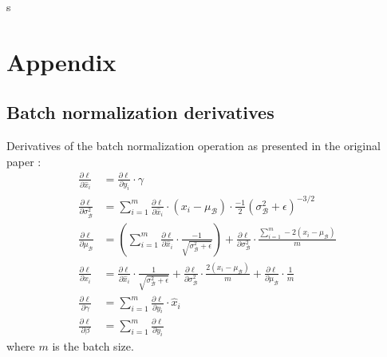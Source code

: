 \documentclass[a4paper,11pt]{article} %
\begin{document}
\newpage
s


\newpage
\section{Appendix}
\subsection{Batch normalization derivatives} \label{appendix:batch-norm-grad}
Derivatives of the batch normalization operation as presented in the original paper \cite{ioffe2015batch}:
\begin{equation}
  \begin{aligned}
    \frac{\partial \ell}{\partial \widehat{x}_{i}} &=\frac{\partial \ell}{\partial y_{i}} \cdot \gamma \\
    \frac{\partial \ell}{\partial \sigma_{\mathcal{B}}^{2}} &=\sum_{i=1}^{m} \frac{\partial \ell}{\partial \widehat{x}_{i}} \cdot\left(x_{i}-\mu_{\mathcal{B}}\right) \cdot \frac{-1}{2}\left(\sigma_{\mathcal{B}}^{2}+\epsilon\right)^{-3 / 2} \\
    \frac{\partial \ell}{\partial \mu_{\mathcal{B}}} &=\left(\sum_{i=1}^{m} \frac{\partial \ell}{\partial \widehat{x}_{i}} \cdot \frac{-1}{\sqrt{\sigma_{\mathcal{B}}^{2}+\epsilon}}\right)+\frac{\partial \ell}{\partial \sigma_{\mathcal{B}}^{2}} \cdot \frac{\sum_{i=1}^{m}-2\left(x_{i}-\mu_{\mathcal{B}}\right)}{m} \\
    \frac{\partial \ell}{\partial x_{i}} &=\frac{\partial \ell}{\partial \widehat{x}_{i}} \cdot \frac{1}{\sqrt{\sigma_{\mathcal{B}}^{2}+\epsilon}}+\frac{\partial \ell}{\partial \sigma_{\mathcal{B}}^{2}} \cdot \frac{2\left(x_{i}-\mu_{\mathcal{B}}\right)}{m}+\frac{\partial \ell}{\partial \mu_{\mathcal{B}}} \cdot \frac{1}{m} \\
    \frac{\partial \ell}{\partial \gamma} &=\sum_{i=1}^{m} \frac{\partial \ell}{\partial y_{i}} \cdot \widehat{x}_{i} \\
    \frac{\partial \ell}{\partial \beta} &=\sum_{i=1}^{m} \frac{\partial \ell}{\partial y_{i}}
  \end{aligned}
\end{equation}
where $m$ is the batch size. 
\end{document}
